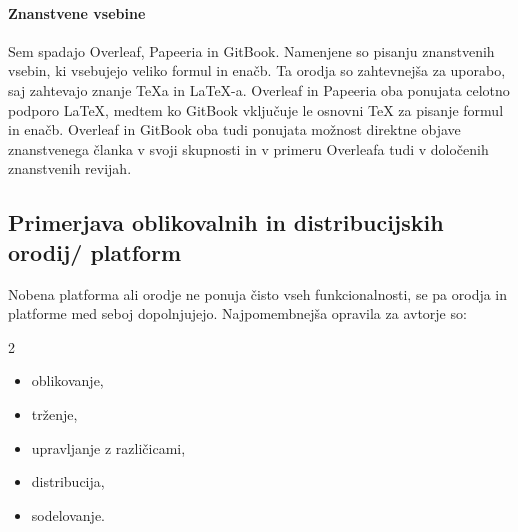 \documentclass[a4paper, 12pt]{book}
\newcommand{\fixspacing}{\vspace{0pt plus 1filll}\mbox{}}
\begin{document}
\paragraph{Znanstvene vsebine}
Sem spadajo Overleaf, Papeeria in GitBook. Namenjene so pisanju	znanstvenih vsebin, ki vsebujejo veliko formul in enačb. Ta orodja so zahtevnejša za uporabo, saj zahtevajo znanje TeXa in {\LaTeX-a}. Overleaf in Papeeria oba ponujata celotno podporo {\LaTeX}, medtem ko GitBook vključuje le osnovni TeX za pisanje formul in enačb. Overleaf in GitBook oba tudi ponujata možnost direktne objave znanstvenega članka v svoji skupnosti in v primeru Overleafa tudi v določenih znanstvenih revijah.

\subsection{Primerjava oblikovalnih in distribucijskih orodij/ platform}
Nobena platforma ali orodje ne ponuja čisto vseh funkcionalnosti, se pa orodja in platforme med seboj dopolnjujejo. Najpomembnejša opravila za avtorje so:
\begin{multicols}{2}
	\begin{itemize}
		\item oblikovanje,
		\item trženje,
		\item upravljanje z različicami,
		\item distribucija,
		\item sodelovanje.
	\end{itemize}
	\fixspacing
\end{multicols}
\end{document}
